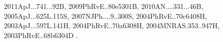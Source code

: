 \documentclass[12pt]{article}
\begin{document}
\begin{enumerate}
\begin{enumerate}
{2011ApJ...741...92B,%
2009PhRvE..80e5301B,%
2010AN....331...46B,%
2005ApJ...625L.115S,%
2007NJPh....9..300S,%
2004PhRvE..70c6408H,%
2003ApJ...597L.141H,%
2004PhRvE..70a6308H,%
2004MNRAS.353..947H,%
2003PhRvE..68b6304D%
}.


\end{enumerate}
\end{enumerate}
\end{document}
